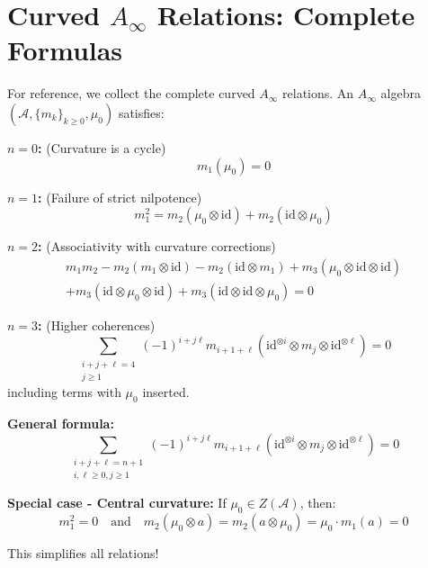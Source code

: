 \chapter{Curved $A_\infty$ Relations: Complete Formulas}
\label{app:curved-ainfty-formulas}

For reference, we collect the complete curved $A_\infty$ relations. An $A_\infty$ algebra 
$(\mathcal{A}, \{m_k\}_{k \geq 0}, \mu_0)$ satisfies:

\textbf{$n = 0$:} (Curvature is a cycle)
$$m_1(\mu_0) = 0$$

\textbf{$n = 1$:} (Failure of strict nilpotence)
$$m_1^2 = m_2(\mu_0 \otimes \text{id}) + m_2(\text{id} \otimes \mu_0)$$

\textbf{$n = 2$:} (Associativity with curvature corrections)
\begin{multline}
m_1 m_2 - m_2(m_1 \otimes \text{id}) - m_2(\text{id} \otimes m_1) + m_3(\mu_0 \otimes \text{id} 
\otimes \text{id}) \\
+ m_3(\text{id} \otimes \mu_0 \otimes \text{id}) + m_3(\text{id} \otimes \text{id} \otimes \mu_0) = 0
\end{multline}

\textbf{$n = 3$:} (Higher coherences)
$$\sum_{\substack{i+j+\ell = 4 \\ j \geq 1}} (-1)^{i+j\ell} m_{i+1+\ell}(\text{id}^{\otimes i} 
\otimes m_j \otimes \text{id}^{\otimes \ell}) = 0$$
including terms with $\mu_0$ inserted.

\textbf{General formula:}
$$\sum_{\substack{i+j+\ell=n+1 \\ i,\ell \geq 0, j \geq 1}} (-1)^{i+j\ell} m_{i+1+\ell}
(\text{id}^{\otimes i} \otimes m_j \otimes \text{id}^{\otimes \ell}) = 0$$

\textbf{Special case - Central curvature:}
If $\mu_0 \in Z(\mathcal{A})$, then:
$$m_1^2 = 0 \quad \text{and} \quad m_2(\mu_0 \otimes a) = m_2(a \otimes \mu_0) 
= \mu_0 \cdot m_1(a) = 0$$

This simplifies all relations! 
